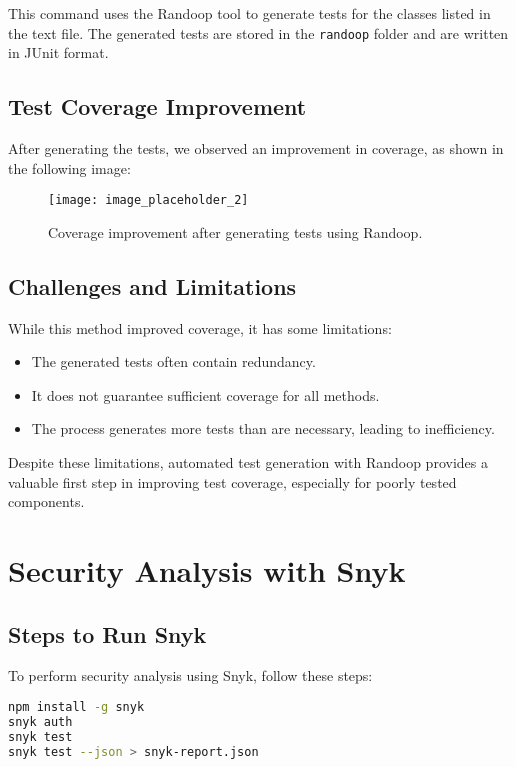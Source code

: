 \documentclass[a4paper,12pt]{report}
\begin{document}
This command uses the Randoop tool to generate tests for the classes listed in the text file. The generated tests are stored in the \texttt{randoop} folder and are written in JUnit format.

\section{Test Coverage Improvement}
After generating the tests, we observed an improvement in coverage, as shown in the following image:
\begin{figure}[H]
    \centering
    \texttt{[image: image\_placeholder\_2]} %
    \caption{Coverage improvement after generating tests using Randoop.}
    \label{fig:coverage-improvement}
\end{figure}

\section{Challenges and Limitations}
While this method improved coverage, it has some limitations:
\begin{itemize}
    \item The generated tests often contain redundancy.
    \item It does not guarantee sufficient coverage for all methods.
    \item The process generates more tests than are necessary, leading to inefficiency.
\end{itemize}
Despite these limitations, automated test generation with Randoop provides a valuable first step in improving test coverage, especially for poorly tested components.

\newpage


\chapter{Security Analysis with Snyk}

\section{Steps to Run Snyk}
To perform security analysis using Snyk, follow these steps:

\begin{lstlisting}[language=bash]
npm install -g snyk
snyk auth
snyk test
snyk test --json > snyk-report.json
\end{lstlisting}
\end{document}
